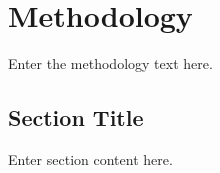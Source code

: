 \newpage
{}

\chapter{Methodology}
\label{chap:methodology}

Enter the methodology text here.

\section{Section Title}

Enter section content here.
